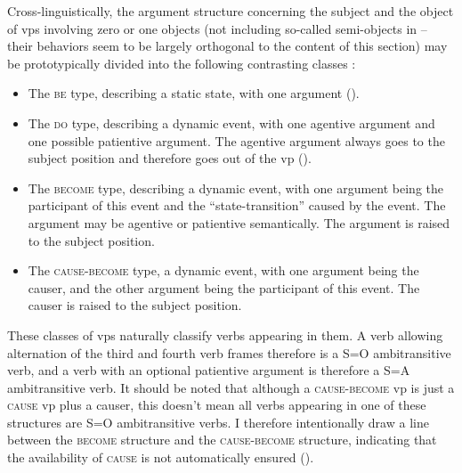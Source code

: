 \documentclass[UTF8, a4paper, oneside, scheme=plain, 12pt]{ctexrep}
\newcommand*{\citechap}[1]{chap.~{#1}}
\newcommand*{\category}[1]{\textsc{#1}}
\begin{document}
Cross-linguistically, 
the argument structure concerning the subject and the object of \acs{vp}s 
involving zero or one objects 
(not including so-called semi-objects in 
-- their behaviors seem to be largely orthogonal to the content of this section)
may be prototypically divided into the following contrasting classes 
\citep[\citechap{6}]{deng2010formal}:
\begin{itemize}
    \item The \category{be} type, describing a static state, with one argument
    ().
    \item The \category{do} type, describing a dynamic event, with one agentive argument 
        and one possible patientive argument.
        The agentive argument always goes to the subject position 
        and therefore goes out of the \acs{vp}
        ().
    \item The \category{become} type, describing a dynamic event, 
        with one argument being the participant of this event 
        and the ``state-transition'' caused by the event. 
        The argument may be agentive or patientive semantically.
        The argument is raised to the subject position.
    \item The \category{cause-become} type, a dynamic event, 
        with one argument being the causer, 
        and the other argument being the participant of this event.
        The causer is raised to the subject position.
\end{itemize}

These classes of \acs{vp}s naturally classify verbs appearing in them.
A verb allowing alternation of the third and fourth verb frames therefore 
is a S=O ambitransitive verb,
and a verb with an optional patientive argument 
is therefore a S=A ambitransitive verb.
It should be noted that although a \category{cause-become} \acs{vp}
is just a \category{cause} \acs{vp} plus a causer, 
this doesn't mean all verbs appearing in one of these structures 
are S=O ambitransitive verbs.
I therefore intentionally draw a line 
between the \category{become} structure 
and the \category{cause}-\category{become} structure, 
indicating that the availability of \category{cause} is not automatically ensured
(). 
\end{document}
